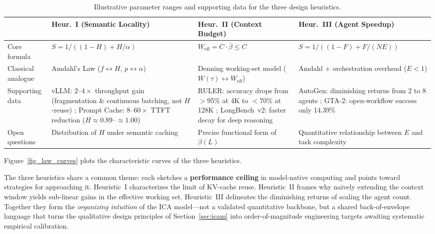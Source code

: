 \begin{table}[h]
    \centering
    \footnotesize
    \caption{Illustrative parameter ranges and supporting data for the three design heuristics.}
    \label{tab:empirical}
    \begin{tabularx}{\textwidth}{lY Y Y}
    \toprule
    & Heur.~I (Semantic Locality) & Heur.~II (Context Budget) & Heur.~III (Agent Speedup) \\
    \midrule
    Core formula & $S = 1/((1-H)+H/\alpha)$ & $W_{\mathrm{eff}} = C\cdot\bar{\beta} \leq C$ & $S = 1/((1-F)+F/(NE))$ \\
    Classical analogue & Amdahl's Law ($f \leftrightarrow H$, $p \leftrightarrow \alpha$) & Denning working-set model ($W(\tau) \leftrightarrow W_{\mathrm{eff}}$) & Amdahl + orchestration overhead ($E < 1$) \\
    Supporting data & vLLM: $2$--$4\times$ throughput gain (fragmentation \& continuous batching, not $H$-reuse) \cite{kwon2023pagedattention}; Prompt Cache: $8$--$60\times$ TTFT reduction ($H \approx 0.89$--$\approx 1.00$) \cite{gim2024promptcache} & RULER: accuracy drops from $>$95\% at 4K to $<$70\% at 128K \cite{ruler2024}; LongBench~v2: faster decay for deep reasoning \cite{longbenchv2_2024} & AutoGen: diminishing returns from 2 to 8 agents \cite{wu2023autogen}; GTA-2: open-workflow success only 14.39\% \cite{gta2_2025} \\
    Open questions & Distribution of $H$ under semantic caching & Precise functional form of $\beta(L)$ & Quantitative relationship between $E$ and task complexity \\
    \bottomrule
    \end{tabularx}
    \end{table}

Figure~\ref{fig_law_curves} plots the characteristic curves of the three heuristics.




The three heuristics share a common theme: each sketches a \textbf{performance ceiling} in model-native computing and points toward strategies for approaching it. Heuristic~I characterizes the limit of KV-cache reuse. Heuristic~II frames why naively extending the context window yields sub-linear gains in the effective working set. Heuristic~III delineates the diminishing returns of scaling the agent count. Together they form the \emph{organizing intuition} of the ICA model---not a validated quantitative backbone, but a shared back-of-envelope language that turns the qualitative design principles of Section~\ref{sec:icam} into order-of-magnitude engineering targets awaiting systematic empirical calibration.
